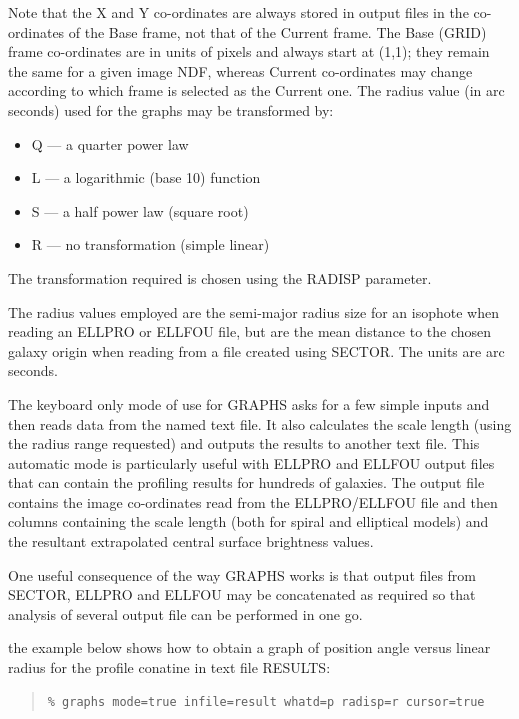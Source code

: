 \documentclass[twoside,11pt]{article}
\newenvironment{myquote}{\begin{quote}\begin{small}}{\end{small}\end{quote}}
\begin{document}
Note that the X and Y co-ordinates are always stored in output files
in the co-ordinates of the Base frame, not that of the Current frame.
The Base (GRID) frame co-ordinates are in units of pixels and
always start at (1,1); they remain the same for a given image NDF,
whereas Current co-ordinates may change according to which frame is
selected as the Current one.
The radius value (in arc seconds) used for the graphs may be transformed by:

\begin{itemize}
\item[] Q --- a quarter power law
\item[] L --- a logarithmic (base 10) function
\item[] S --- a half power law (square root)
\item[] R --- no transformation (simple linear)
\end{itemize}

The transformation required is chosen using the RADISP parameter.

The radius values employed are the semi-major radius size for an isophote
when reading an ELLPRO or ELLFOU file, but are the mean distance to the
chosen galaxy origin when reading from a file created using SECTOR. The
units are arc seconds.

The keyboard only mode of use for GRAPHS asks for a few simple inputs and then
reads data from the named text file. It also calculates the scale length
(using the radius range requested) and outputs the results to another text
file. This automatic mode is particularly useful with ELLPRO and ELLFOU
output files that can contain the profiling results for hundreds of galaxies.
The output file contains the image co-ordinates read from the ELLPRO/ELLFOU
file and then columns containing the scale length (both for spiral and
elliptical models) and the resultant extrapolated central surface
brightness values.

One useful consequence of the way GRAPHS works is that output files from
SECTOR, ELLPRO and ELLFOU may be concatenated as required so that
analysis of several output file can be performed in one go.

the example below shows how to obtain a graph of position angle versus linear
radius for the profile conatine in text file RESULTS:

\begin{myquote}
\begin{verbatim}
% graphs mode=true infile=result whatd=p radisp=r cursor=true
\end{verbatim}
\end{myquote}
\end{document}
